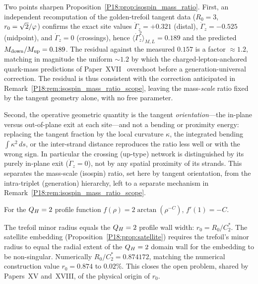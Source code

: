 \begin{remark}
\label{P18:rem:isospin_scale_residual}
Two points sharpen Proposition~\ref{P18:prop:isospin_mass_ratio}.
First, an independent recomputation of the golden-trefoil tangent data
($R_0=3$, $r_0=\sqrt{2}/\varphi$) confirms the exact site values
$\dot\Gamma_z=+0.321$ (distal), $\dot\Gamma_z=-0.525$ (midpoint), and
$\dot\Gamma_z=0$ (crossings), hence
$\langle\dot\Gamma_z^2\rangle_{M,L}=0.189$ and the predicted
$M_{\rm down}/M_{\rm up}=0.189$. The residual against the measured
$0.157$ is a factor $\approx1.2$, matching in magnitude the uniform
$\sim\!1.2$ by which the charged-lepton-anchored quark-mass
predictions of Paper~XVII~\cite{Paper17} overshoot before a
generation-universal correction. The residual is thus consistent with
the correction anticipated in
Remark~\ref{P18:rem:isospin_mass_ratio_scope}, leaving the
mass-\emph{scale} ratio fixed by the tangent geometry alone, with no
free parameter.

Second, the operative geometric quantity is the tangent
\emph{orientation}---the in-plane versus out-of-plane exit at each
site---and not a bending or proximity energy: replacing the tangent
fraction by the local curvature $\kappa$, the integrated bending
$\int\kappa^2\,ds$, or the inter-strand distance reproduces the ratio
less well or with the wrong sign. In particular the crossing
(up-type) network is distinguished by its purely in-plane exit
($\dot\Gamma_z=0$), not by any spatial proximity of its strands. This
separates the mass-scale (isospin) ratio, set here by tangent
orientation, from the intra-triplet (generation) hierarchy, left to a
separate mechanism in
Remark~\ref{P18:rem:isospin_mass_ratio_scope}.
\end{remark}

\begin{lemma}
\label{P19:lem:profile_slope}
For the $Q_H=2$ profile function $f(\rho)=2\arctan(\rho^{-C})$,
$f'(1)=-C$.
\end{lemma}

\begin{theorem}
\label{P19:thm:r0_derivation}
The trefoil minor radius equals the $Q_H=2$ profile wall width:
$r_0 = R_0/C_2^*$. The satellite embedding
(Proposition~\ref{P18:prop:satellite}) requires the trefoil's minor
radius to equal the radial extent of the $Q_H=2$ domain wall for the
embedding to be non-singular. Numerically $R_0/C_2^*=0.874172$,
matching the numerical construction value $r_0=0.874$ to $0.02\%$.
This closes the open problem, shared by Papers~XV and~XVIII, of the
physical origin of $r_0$.
\end{theorem}

